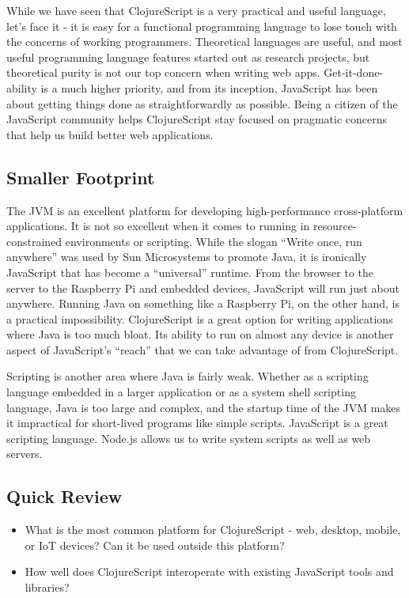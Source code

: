 \documentclass[10pt,twoside,openright]{memoir}
\begin{document}
While we have seen that ClojureScript is a very practical and useful
language, let's face it - it is easy for a functional programming
language to lose touch with the concerns of working programmers.
Theoretical languages are useful, and most useful programming language
features started out as research projects, but theoretical purity is not
our top concern when writing web apps. Get-it-done-ability is a much
higher priority, and from its inception, JavaScript has been about
getting things done as straightforwardly as possible. Being a citizen of
the JavaScript community helps ClojureScript stay focused on pragmatic
concerns that help us build better web applications.

\subsection{Smaller Footprint}

The JVM is an excellent platform for developing high-performance
cross-platform applications. It is not so excellent when it comes to
running in resource-constrained environments or scripting. While the
slogan ``Write once, run anywhere'' was used by Sun Microsystems to
promote Java, it is ironically JavaScript that has become a
``universal'' runtime. From the browser to the server to the Raspberry
Pi and embedded devices, JavaScript will run just about anywhere.
Running Java on something like a Raspberry Pi, on the other hand, is a
practical impossibility. ClojureScript is a great option for writing
applications where Java is too much bloat. Its ability to run on almost
any device is another aspect of JavaScript's ``reach'' that we can take
advantage of from ClojureScript.

Scripting is another area where Java is fairly weak. Whether as a
scripting language embedded in a larger application or as a system shell
scripting language, Java is too large and complex, and the startup time
of the JVM makes it impractical for short-lived programs like simple
scripts. JavaScript is a great scripting language. Node.js allows us to
write system scripts as well as web servers.

\subsection{Quick Review}

\begin{itemize}
\tightlist
\item
  What is the most common platform for ClojureScript - web, desktop,
  mobile, or IoT devices? Can it be used outside this platform?
\item
  How well does ClojureScript interoperate with existing JavaScript
  tools and libraries?
\end{itemize}
\end{document}
